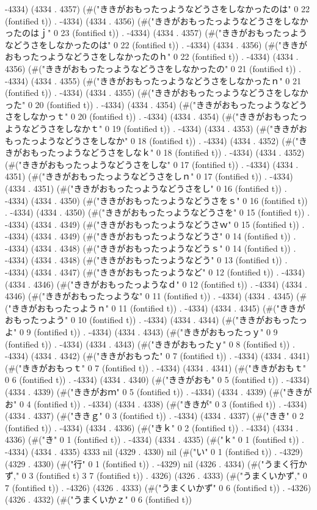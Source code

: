 -4334) (4334 . 4357) (#("ききがおもったっようなどうさをしなかったのは" 0 22 (fontified t)) . -4334) (4334 . 4356) (#("ききがおもったっようなどうさをしなかったのはｊ" 0 23 (fontified t)) . -4334) (4334 . 4357) (#("ききがおもったっようなどうさをしなかったのは" 0 22 (fontified t)) . -4334) (4334 . 4356) (#("ききがおもったっようなどうさをしなかったのｈ" 0 22 (fontified t)) . -4334) (4334 . 4356) (#("ききがおもったっようなどうさをしなかったの" 0 21 (fontified t)) . -4334) (4334 . 4355) (#("ききがおもったっようなどうさをしなかったｎ" 0 21 (fontified t)) . -4334) (4334 . 4355) (#("ききがおもったっようなどうさをしなかった" 0 20 (fontified t)) . -4334) (4334 . 4354) (#("ききがおもったっようなどうさをしなかっｔ" 0 20 (fontified t)) . -4334) (4334 . 4354) (#("ききがおもったっようなどうさをしなかｔ" 0 19 (fontified t)) . -4334) (4334 . 4353) (#("ききがおもったっようなどうさをしなか" 0 18 (fontified t)) . -4334) (4334 . 4352) (#("ききがおもったっようなどうさをしなｋ" 0 18 (fontified t)) . -4334) (4334 . 4352) (#("ききがおもったっようなどうさをしな" 0 17 (fontified t)) . -4334) (4334 . 4351) (#("ききがおもったっようなどうさをしｎ" 0 17 (fontified t)) . -4334) (4334 . 4351) (#("ききがおもったっようなどうさをし" 0 16 (fontified t)) . -4334) (4334 . 4350) (#("ききがおもったっようなどうさをｓ" 0 16 (fontified t)) . -4334) (4334 . 4350) (#("ききがおもったっようなどうさを" 0 15 (fontified t)) . -4334) (4334 . 4349) (#("ききがおもったっようなどうさｗ" 0 15 (fontified t)) . -4334) (4334 . 4349) (#("ききがおもったっようなどうさ" 0 14 (fontified t)) . -4334) (4334 . 4348) (#("ききがおもったっようなどうｓ" 0 14 (fontified t)) . -4334) (4334 . 4348) (#("ききがおもったっようなどう" 0 13 (fontified t)) . -4334) (4334 . 4347) (#("ききがおもったっようなど" 0 12 (fontified t)) . -4334) (4334 . 4346) (#("ききがおもったっようなｄ" 0 12 (fontified t)) . -4334) (4334 . 4346) (#("ききがおもったっような" 0 11 (fontified t)) . -4334) (4334 . 4345) (#("ききがおもったっようｎ" 0 11 (fontified t)) . -4334) (4334 . 4345) (#("ききがおもったっよう" 0 10 (fontified t)) . -4334) (4334 . 4344) (#("ききがおもったっよ" 0 9 (fontified t)) . -4334) (4334 . 4343) (#("ききがおもったっｙ" 0 9 (fontified t)) . -4334) (4334 . 4343) (#("ききがおもったｙ" 0 8 (fontified t)) . -4334) (4334 . 4342) (#("ききがおもった" 0 7 (fontified t)) . -4334) (4334 . 4341) (#("ききがおもっｔ" 0 7 (fontified t)) . -4334) (4334 . 4341) (#("ききがおもｔ" 0 6 (fontified t)) . -4334) (4334 . 4340) (#("ききがおも" 0 5 (fontified t)) . -4334) (4334 . 4339) (#("ききがおｍ" 0 5 (fontified t)) . -4334) (4334 . 4339) (#("ききがお" 0 4 (fontified t)) . -4334) (4334 . 4338) (#("ききが" 0 3 (fontified t)) . -4334) (4334 . 4337) (#("ききｇ" 0 3 (fontified t)) . -4334) (4334 . 4337) (#("きき" 0 2 (fontified t)) . -4334) (4334 . 4336) (#("きｋ" 0 2 (fontified t)) . -4334) (4334 . 4336) (#("き" 0 1 (fontified t)) . -4334) (4334 . 4335) (#("ｋ" 0 1 (fontified t)) . -4334) (4334 . 4335) 4333 nil (4329 . 4330) nil (#("い" 0 1 (fontified t)) . -4329) (4329 . 4330) (#("行" 0 1 (fontified t)) . -4329) nil (4326 . 4334) (#("うまく行かず," 0 3 (fontified t) 3 7 (fontified t)) . 4326) (4326 . 4333) (#("うまくいかず," 0 7 (fontified t)) . -4326) (4326 . 4333) (#("うまくいかず" 0 6 (fontified t)) . -4326) (4326 . 4332) (#("うまくいかｚ" 0 6 (fontified t)) 